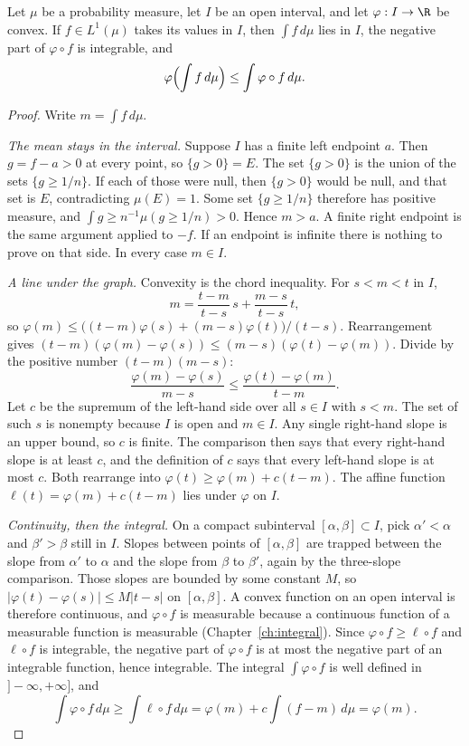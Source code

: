 \begin{theorem}\label{thm:jensen}
Let $\mu$ be a probability measure, let $I$ be an open interval, and let $\varphi:I\to\R$ be convex. If $f\in L^1(\mu)$ takes its values in $I$, then $\int f\,d\mu$ lies in $I$, the negative part of $\varphi\circ f$ is integrable, and
\[\varphi\Bigl(\int f\,d\mu\Bigr)\le\int\varphi\circ f\,d\mu.\]
\end{theorem}
\begin{proof}
Write $m=\int f\,d\mu$.

\emph{The mean stays in the interval.} Suppose $I$ has a finite left endpoint $a$. Then $g=f-a>0$ at every point, so $\{g>0\}=E$. The set $\{g>0\}$ is the union of the sets $\{g\ge1/n\}$. If each of those were null, then $\{g>0\}$ would be null, and that set is $E$, contradicting $\mu(E)=1$. Some set $\{g\ge1/n\}$ therefore has positive measure, and $\int g\ge n^{-1}\mu(g\ge1/n)>0$. Hence $m>a$. A finite right endpoint is the same argument applied to $-f$. If an endpoint is infinite there is nothing to prove on that side. In every case $m\in I$.

\emph{A line under the graph.} Convexity is the chord inequality. For $s<m<t$ in $I$,
\[m=\frac{t-m}{t-s}\,s+\frac{m-s}{t-s}\,t,\]
so $\varphi(m)\le\bigl((t-m)\varphi(s)+(m-s)\varphi(t)\bigr)/(t-s)$. Rearrangement gives $(t-m)(\varphi(m)-\varphi(s))\le(m-s)(\varphi(t)-\varphi(m))$. Divide by the positive number $(t-m)(m-s)$:
\[\frac{\varphi(m)-\varphi(s)}{m-s}\le\frac{\varphi(t)-\varphi(m)}{t-m}.\]
Let $c$ be the supremum of the left-hand side over all $s\in I$ with $s<m$. The set of such $s$ is nonempty because $I$ is open and $m\in I$. Any single right-hand slope is an upper bound, so $c$ is finite. The comparison then says that every right-hand slope is at least $c$, and the definition of $c$ says that every left-hand slope is at most $c$. Both rearrange into $\varphi(t)\ge\varphi(m)+c(t-m)$. The affine function $\ell(t)=\varphi(m)+c(t-m)$ lies under $\varphi$ on $I$.

\emph{Continuity, then the integral.} On a compact subinterval $[\alpha,\beta]\subset I$, pick $\alpha'<\alpha$ and $\beta'>\beta$ still in $I$. Slopes between points of $[\alpha,\beta]$ are trapped between the slope from $\alpha'$ to $\alpha$ and the slope from $\beta$ to $\beta'$, again by the three-slope comparison. Those slopes are bounded by some constant $M$, so $|\varphi(t)-\varphi(s)|\le M|t-s|$ on $[\alpha,\beta]$. A convex function on an open interval is therefore continuous, and $\varphi\circ f$ is measurable because a continuous function of a measurable function is measurable (Chapter~\ref{ch:integral}). Since $\varphi\circ f\ge\ell\circ f$ and $\ell\circ f$ is integrable, the negative part of $\varphi\circ f$ is at most the negative part of an integrable function, hence integrable. The integral $\int\varphi\circ f$ is well defined in $]-\infty,+\infty]$, and
\[\int\varphi\circ f\,d\mu\ge\int\ell\circ f\,d\mu=\varphi(m)+c\int(f-m)\,d\mu=\varphi(m).\]
\end{proof}

